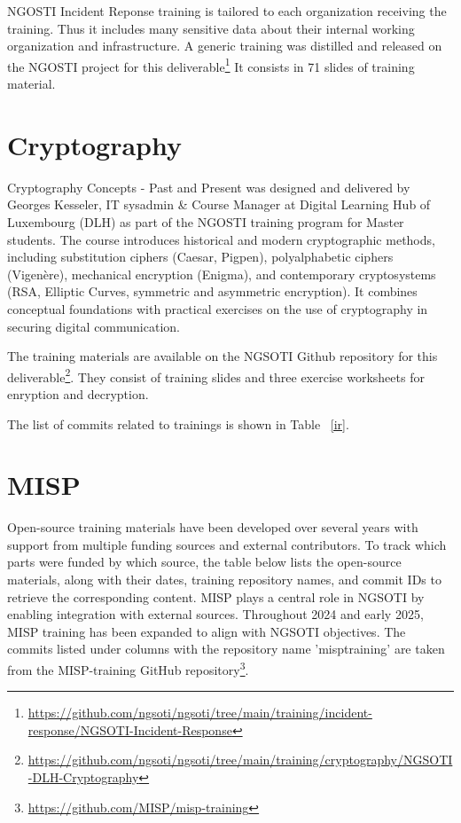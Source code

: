 \documentclass[10pt,a4paper]{report}
\begin{document}
NGOSTI Incident Reponse training is tailored to each organization receiving the
training. Thus it includes many sensitive data about their internal working
organization and infrastructure.
A generic training was distilled and released on the NGOSTI project for this
deliverable\footnote{\url{https://github.com/ngsoti/ngsoti/tree/main/training/incident-response/NGSOTI-Incident-Response}}
It consists in 71 slides of training material.

\section{Cryptography}

Cryptography Concepts - Past and Present was designed and delivered by Georges Kesseler, IT sysadmin \& Course Manager at Digital Learning Hub of Luxembourg (DLH) as part of the NGOSTI training program for Master students. The course introduces historical and modern cryptographic methods, including substitution ciphers (Caesar, Pigpen), polyalphabetic ciphers (Vigenère), mechanical encryption (Enigma), and contemporary cryptosystems (RSA, Elliptic Curves, symmetric and asymmetric encryption). It combines conceptual foundations with practical exercises on the use of cryptography in securing digital communication.

The training materials are available on the NGSOTI Github repository for this deliverable\footnote{\url{https://github.com/ngsoti/ngsoti/tree/main/training/cryptography/NGSOTI-DLH-Cryptography}}. They consist of training slides and three exercise worksheets for enryption and decryption.



The list of commits related to trainings is shown in Table ~\ref{ir}.

\section{MISP}
Open-source training materials have been developed over several years with support from multiple funding sources and external contributors. To track which parts were funded by which source, the table below lists the open-source materials, along with their dates, training repository names, and commit IDs to retrieve the corresponding content.
MISP plays a central role in NGSOTI by enabling integration with external sources. Throughout 2024 and early 2025, MISP training has been expanded to align with NGSOTI objectives.
The commits listed under columns with the repository name 'misptraining' are taken from the MISP-training GitHub repository\footnote{\url{https://github.com/MISP/misp-training}}.
\end{document}
